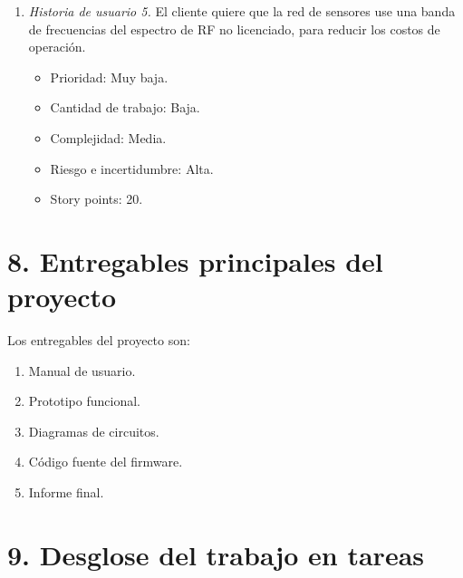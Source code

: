 \documentclass[
11pt, %
]{charter}
\begin{document}
\begin{enumerate}
	\item \textit{Historia de usuario 5.} El cliente quiere que la red de sensores use una banda de frecuencias del espectro de RF no licenciado, para reducir los costos de operación.
	\begin{itemize}
		\item Prioridad: Muy baja.
		\item Cantidad de trabajo: Baja.
		\item Complejidad: Media.
		\item Riesgo e incertidumbre: Alta.
		\item Story points: 20.
	\end{itemize}
\end{enumerate}

\section{8. Entregables principales del proyecto}
\label{sec:entregables}

Los entregables del proyecto son:
	\begin{enumerate}
		\item Manual de usuario.
		\item Prototipo funcional.
		\item Diagramas de circuitos.
		\item Código fuente del firmware.
		\item Informe final.
	\end{enumerate}

\section{9. Desglose del trabajo en tareas}
\label{sec:wbs}
\end{document}
